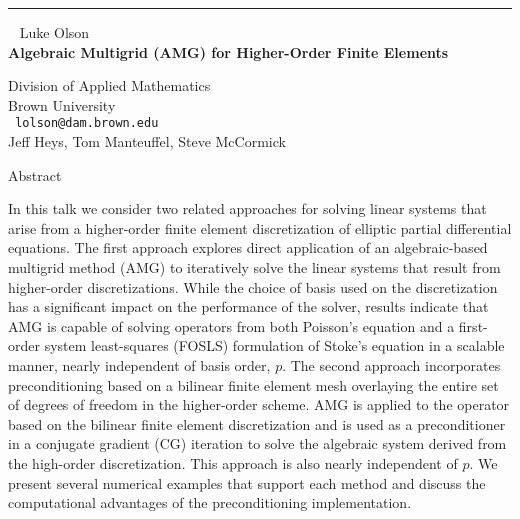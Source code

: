 \documentclass{report}
\begin{document}
\begin{center}

\rule{6in}{1pt} \
{\large
Luke Olson
\\ {\bf
Algebraic Multigrid (AMG) for Higher-Order Finite Elements
}}

Division of Applied Mathematics \\
Brown University
\\ {\tt
lolson@dam.brown.edu
}
\\
Jeff Heys,
Tom Manteuffel,
Steve McCormick
\end{center}


Abstract

In this talk we consider two related approaches for solving linear
systems that arise from a higher-order finite element discretization of
elliptic partial differential equations. The first approach explores
direct application of an algebraic-based multigrid method (AMG) to
iteratively solve the linear systems that result from higher-order
discretizations. While the choice of basis used on the discretization
has a significant impact on the performance of the solver, results
indicate that AMG is capable of solving operators from both Poisson's
equation and a first-order system least-squares (FOSLS) formulation of
Stoke's equation in a scalable manner, nearly independent of basis
order, $p$. The second approach incorporates preconditioning based on a
bilinear finite element mesh overlaying the entire set of degrees of
freedom in the higher-order scheme. AMG is applied to the operator
based on the bilinear finite element discretization and is used as a
preconditioner in a conjugate gradient (CG) iteration to solve the
algebraic system derived from the high-order discretization. This
approach is also nearly independent of $p$. We present several numerical
examples that support each method and discuss the computational
advantages of the preconditioning implementation. 
\end{document}
